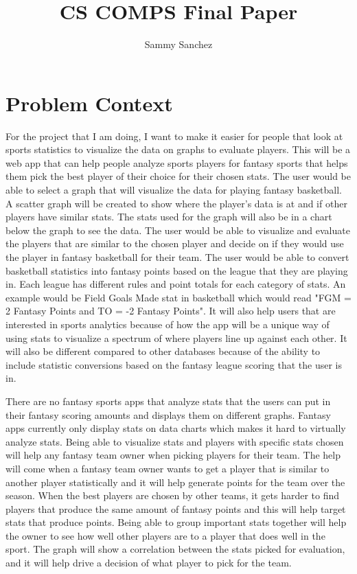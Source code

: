 \documentclass[10pt,twocolumn]{article}
\title{CS COMPS Final Paper}
\author{Sammy Sanchez}
\affiliation{Occidental College}
\begin{document}
\maketitle

\section{Problem Context}

For the project that I am doing, I want to make it easier for people that look at sports statistics to visualize the data on graphs to evaluate players. This will be a web app that can help people analyze sports players for fantasy sports that helps them pick the best player of their choice for their chosen stats. The user would be able to select a graph that will visualize the data for playing fantasy basketball. A scatter graph will be created to show where the player's data is at and if other players have similar stats. The stats used for the graph will also be in a chart below the graph to see the data. The user would be able to visualize and evaluate the players that are similar to the chosen player and decide on if they would use the player in fantasy basketball for their team. The user would be able to convert basketball statistics into fantasy points based on the league that they are playing in. Each league has different rules and point totals for each category of stats. An example would be Field Goals Made stat in basketball which would read "FGM = 2 Fantasy Points and TO = -2 Fantasy Points". It will also help users that are interested in sports analytics because of how the app will be a unique way of using stats to visualize a spectrum of where players line up against each other. It will also be different compared to other databases because of the ability to include statistic conversions based on the fantasy league scoring that the user is in. 

There are no fantasy sports apps that analyze stats that the users can put in their fantasy scoring amounts and displays them on different graphs. Fantasy apps currently only display stats on data charts which makes it hard to virtually analyze stats. Being able to visualize stats and players with specific stats chosen will help any fantasy team owner when picking players for their team. The help will come when a fantasy team owner wants to get a player that is similar to another player statistically and it will help generate points for the team over the season. When the best players are chosen by other teams, it gets harder to find players that produce the same amount of fantasy points and this will help target stats that produce points. Being able to group important stats together will help the owner to see how well other players are to a player that does well in the sport. The graph will show a correlation between the stats picked for evaluation, and it will help drive a decision of what player to pick for the team. 
\end{document}
